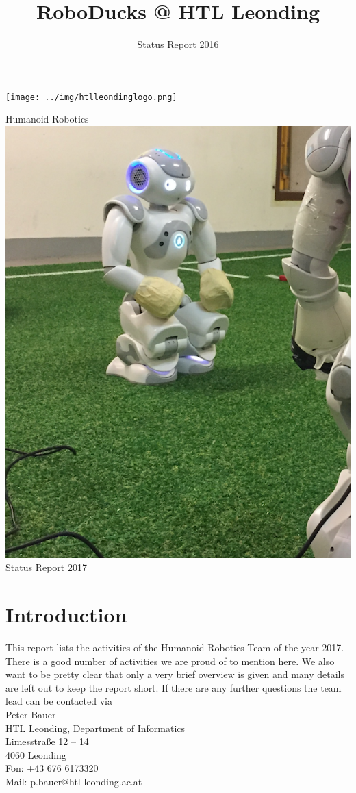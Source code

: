 \documentclass[11pt]{article}
\title{RoboDucks @ HTL Leonding}
\author{Status Report 2016}
\begin{document}
\begin{titlepage}
\begin{flushright}
\texttt{[image: ../img/htlleondinglogo.png]}\\
\end{flushright}

\vspace{3em}

\begin{center}
{\Huge Humanoid Robotics} \\[2em]
\includegraphics[scale=0.55]{img/Titlepage.png}\\[2em]
{\LARGE Status Report 2017}
\end{center}
\end{titlepage}

\section{Introduction}
This report lists the activities of the Humanoid Robotics Team of the year 2017. There is a good number of activities we are proud of to mention here. We also want to be pretty clear that only  a very brief overview is given and many details are left out to keep the report short. If there are any further questions the team lead can be contacted via \\[1em]
Peter Bauer\\
HTL Leonding, Department of Informatics\\
Limesstraße 12 -- 14\\
4060 Leonding\\
Fon: +43 676 6173320\\
Mail: p.bauer@htl-leonding.ac.at
\end{document}
